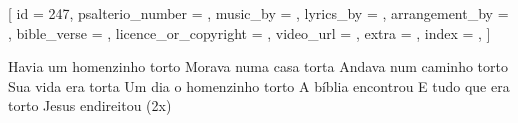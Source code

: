 
[
    id                     = {247},
    psalterio_number       = {},
    music_by               = {},
    lyrics_by              = {},
    arrangement_by         = {},
    bible_verse            = {},
    licence_or_copyright   = {},
    video_url              = {},
    extra                  = {},
    index                  = {},
]


\beginchorus

Havia um homenzinho torto 
Morava numa casa torta 
Andava num caminho torto 
Sua vida era torta
Um dia o homenzinho torto 
A bíblia encontrou
E tudo que era torto
Jesus endireitou
(2x)
\endchorus


\endsong

